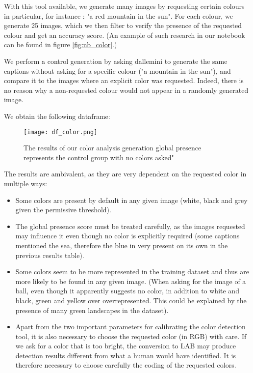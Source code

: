 \documentclass{article}
\begin{document}
\begin{multicols}{2}
With this tool available, we generate many images by requesting certain colours in particular, for instance : "a red mountain in the sun". For each colour, we generate 25 images, which we then filter to verify the presence of the requested colour and get an accuracy score. (An example of such research in our notebook can be found in figure \ref{fig:nb_color}.)

We perform a control generation by asking \gls{dallemini} to generate the same captions without asking for a specific colour ("a mountain in the sun"), and compare it to the images where an explicit color was requested. Indeed, there is no reason why a non-requested colour would not appear in a randomly generated image.

We obtain the following dataframe:

\begin{figure}[H]
    \centering
    \texttt{[image: df\_color.png]}
    \caption{The results of our color analysis generation global presence represents the control group with no colors asked"}
    \label{fig:df_color}
\end{figure}

The results are ambivalent, as they are very dependent on the requested color in multiple ways: 

\begin{itemize}
    \item Some colors are present by default in any given image (white, black and grey given the permissive threshold).
    \item The global presence score must be treated carefully, as the images requested may influence it even though no color is explicitly required (some captions mentioned the sea, therefore the blue in very present on its own in the previous results table).
    \item Some colors seem to be more represented in the training dataset and thus are more likely to be found in any given image. (When asking for the image of a ball, even though it apparently suggests no color, in addition to white and black, green and yellow over overrepresented. This could be explained by the presence of many green landscapes in the dataset).
    \item Apart from the two important parameters for calibrating the color detection tool, it is also necessary to choose the requested color (in RGB) with care. If we ask for a color that is too bright, the conversion to LAB may produce detection results different from what a human would have identified. It is therefore necessary to choose carefully the coding of the requested colors.
\end{itemize}  


\end{multicols}
\end{document}
